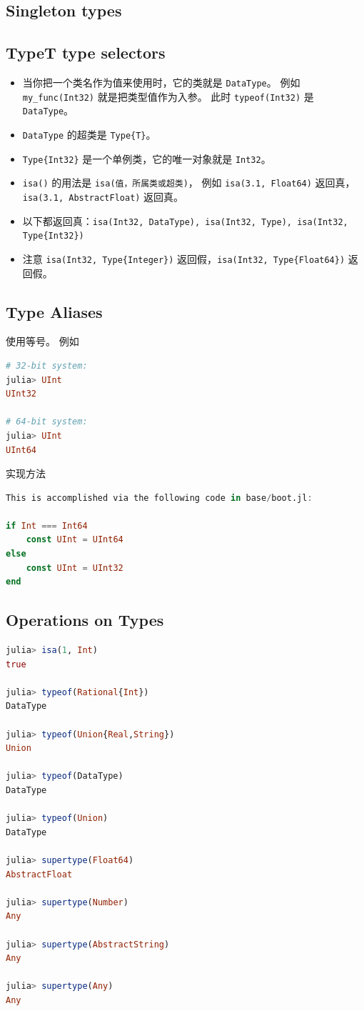 \subsection{Singleton types}

\subsection{Type{T} type selectors}
\begin{itemize}
\item 当你把一个类名作为值来使用时，它的类就是 \verb`DataType`。 例如 \verb`my_func(Int32)` 就是把类型值作为入参。 此时 \verb`typeof(Int32)` 是 \verb`DataType`。
\item \verb`DataType` 的超类是 \verb`Type{T}`。
\item \verb`Type{Int32}` 是一个单例类，它的唯一对象就是 \verb`Int32`。
\item \verb`isa()` 的用法是 \verb`isa(值，所属类或超类)`， 例如 \verb`isa(3.1, Float64)` 返回真，\verb`isa(3.1, AbstractFloat)` 返回真。
\item 以下都返回真：\verb`isa(Int32, DataType), isa(Int32, Type), isa(Int32, Type{Int32})` 
\item 注意 \verb`isa(Int32, Type{Integer})` 返回假，\verb`isa(Int32, Type{Float64})` 返回假。
\end{itemize}

\subsection{Type Aliases}
使用等号。 例如
\begin{lstlisting}[language=julia]
# 32-bit system:
julia> UInt
UInt32

# 64-bit system:
julia> UInt
UInt64
\end{lstlisting}
实现方法
\begin{lstlisting}[language=julia]
This is accomplished via the following code in base/boot.jl:

if Int === Int64
    const UInt = UInt64
else
    const UInt = UInt32
end
\end{lstlisting}

\subsection{Operations on Types}
\begin{lstlisting}[language=julia]
julia> isa(1, Int)
true

julia> typeof(Rational{Int})
DataType

julia> typeof(Union{Real,String})
Union

julia> typeof(DataType)
DataType

julia> typeof(Union)
DataType

julia> supertype(Float64)
AbstractFloat

julia> supertype(Number)
Any

julia> supertype(AbstractString)
Any

julia> supertype(Any)
Any
\end{lstlisting}

